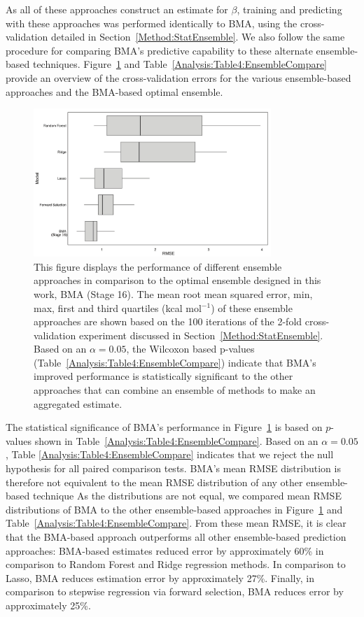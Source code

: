 \documentclass[journal=jpcbfk, manuscript=article]{achemso}
\newcommand{\+}[1]{\ensuremath{\mathbf{#1}}}
\begin{document}
As all of these approaches construct an estimate for $\beta$, training and predicting with these approaches was performed identically to BMA, using the cross-validation detailed in Section~\ref{Method:StatEnsemble}.
We also follow the same procedure for comparing BMA's predictive capability to these alternate ensemble-based techniques.
Figure~\ref{Analysis:Figure6:Models} and Table~\ref{Analysis:Table4:EnsembleCompare} provide an overview of the cross-validation errors for the various ensemble-based approaches and the BMA-based optimal ensemble.
\begin{figure}
	\centering
	\includegraphics[keepaspectratio,width=0.8\textwidth]{Figures/BMA_Xval_baselineModels_RMSE}
	\caption{This figure displays the performance of different ensemble approaches in comparison to the optimal ensemble designed in this work, BMA (Stage 16).
	The mean root mean squared error, min, max, first and third quartiles (kcal mol$^{-1}$) of these ensemble approaches are shown based on the 100 iterations of the 2-fold cross-validation experiment discussed in Section~\ref{Method:StatEnsemble}.
	Based on an $\alpha = 0.05$, the Wilcoxon based p-values (Table~\ref{Analysis:Table4:EnsembleCompare}) indicate that BMA's improved performance is statistically significant to the other approaches that can combine an ensemble of methods to make an aggregated estimate.}
	\label{Analysis:Figure6:Models}
\end{figure}
The statistical significance of BMA's performance in Figure~\ref{Analysis:Figure6:Models} is based on $p$-values shown in Table~\ref{Analysis:Table4:EnsembleCompare}. Based on an $\alpha = 0.05$, Table \ref{Analysis:Table4:EnsembleCompare} indicates that we reject the null hypothesis for all paired comparison tests.
BMA's mean RMSE distribution is therefore not equivalent to the mean RMSE distribution of any other ensemble-based technique
As the distributions are not equal, we compared mean RMSE distributions of BMA to the other ensemble-based approaches in Figure~\ref{Analysis:Figure6:Models} and Table~\ref{Analysis:Table4:EnsembleCompare}.
From these mean RMSE, it is clear that the BMA-based approach outperforms all other ensemble-based prediction approaches: BMA-based estimates reduced error by approximately 60\% in comparison to Random Forest and Ridge regression methods. In comparison to Lasso, BMA reduces estimation error by approximately 27\%.
Finally, in comparison to stepwise regression via forward selection, BMA reduces error by approximately 25\%.
\end{document}

